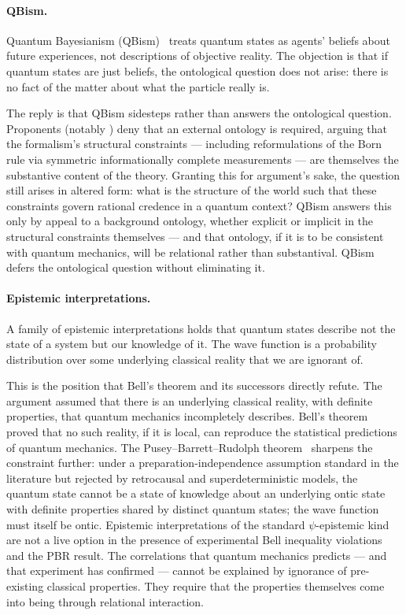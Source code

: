 \paragraph{QBism.}
Quantum Bayesianism (QBism)~\citep{FuchsMerminSchack2014} treats quantum states as
agents' beliefs about future experiences, not descriptions of objective
reality.
The objection is that if quantum states are just beliefs, the ontological
question does not arise: there is no fact of the matter about what the
particle really is.

The reply is that QBism sidesteps rather than answers the ontological question.
Proponents (notably \citealt{FuchsMerminSchack2014}) deny that an external
ontology is required, arguing that the formalism's structural constraints ---
including reformulations of the Born rule via symmetric informationally
complete measurements --- are themselves the substantive content of the
theory.
Granting this for argument's sake, the question still arises in altered form:
what is the structure of the world such that these constraints govern
rational credence in a quantum context?
QBism answers this only by appeal to a background ontology, whether explicit
or implicit in the structural constraints themselves --- and that ontology,
if it is to be consistent with quantum mechanics, will be relational rather
than substantival.
QBism defers the ontological question without eliminating it.

\paragraph{Epistemic interpretations.}
A family of epistemic interpretations holds that quantum states describe
not the state of a system but our knowledge of it.
The wave function is a probability distribution over some underlying
classical reality that we are ignorant of.

This is the position that Bell's theorem and its successors directly refute.
The \citet{Einstein1935EPR} argument assumed that there is an underlying
classical reality, with definite properties, that quantum mechanics
incompletely describes.
Bell's theorem proved that no such reality, if it is local, can reproduce
the statistical predictions of quantum mechanics.
The Pusey--Barrett--Rudolph theorem~\citep{PBR2012} sharpens the constraint
further: under a preparation-independence assumption standard in the
literature but rejected by retrocausal and superdeterministic models, the
quantum state cannot be a state of knowledge about an underlying ontic
state with definite properties shared by distinct quantum states; the
wave function must itself be ontic.
Epistemic interpretations of the standard $\psi$-epistemic kind are not
a live option in the presence of experimental Bell inequality violations
and the PBR result.
The correlations that quantum mechanics predicts --- and that experiment
has confirmed --- cannot be explained by ignorance of pre-existing classical
properties.
They require that the properties themselves come into being through
relational interaction.

